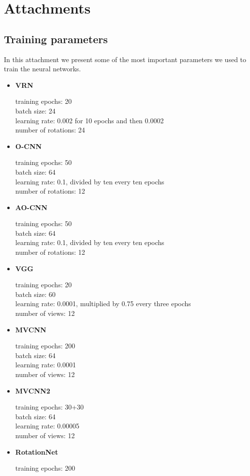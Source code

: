 \appendix
\chapter{Attachments}
\section{Training parameters}
\label{Attachment:params}
In this attachment we present some of the most important parameters we used to train the neural networks.

\def\myitem #1#2{
	\item { \textbf{#1} \par #2
	}
}

\begin{itemize}
\myitem{VRN}{
	training epochs: 20\\
	batch size: 24\\
	learning rate: 0.002 for 10 epochs and then 0.0002\\
	number of rotations: 24\\}
\myitem{O-CNN}{
	training epochs: 50\\
	batch size: 64\\
	learning rate: 0.1, divided by ten every ten epochs\\
	number of rotations: 12\\}
\myitem{AO-CNN}{
	training epochs: 50\\
	batch size: 64\\
	learning rate: 0.1, divided by ten every ten epochs\\
	number of rotations: 12\\}
\myitem{VGG}{
	training epochs: 20\\
	batch size: 60\\
	learning rate: 0.0001, multiplied by 0.75 every three epochs\\
	number of views: 12\\}
\myitem{MVCNN}{
	training epochs: 200\\
	batch size: 64\\
	learning rate: 0.0001\\
	number of views: 12\\}
\myitem{MVCNN2}{
	training epochs: 30+30\\
	batch size: 64\\
	learning rate: 0.00005\\
	number of views: 12\\}
\myitem{RotationNet}{
	training epochs: 200\\
}
\end{itemize}

